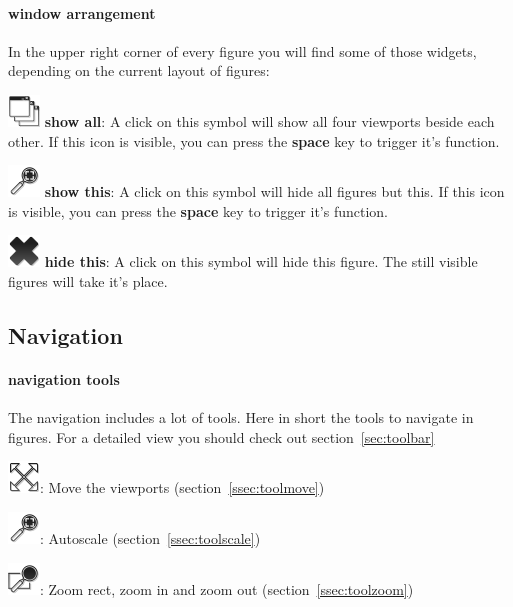 \documentclass[a4paper,11pt]{report}
\begin{document}
\paragraph{window arrangement} In the upper right corner of every figure you will find some of those widgets, depending on the current layout of figures:
\begin{trivlist}
\leftskip=1cm
\item[] \includegraphics[scale = 0.5]{../../icons/windows.png} \textbf{show all}: A click on this symbol will show all four viewports beside each other. If this icon is visible, you can press the \textbf{space} key to trigger it's function.
\item[] \includegraphics[scale = 0.5]{../../icons/zoom_all.png} \textbf{show this}: A click on this symbol will hide all figures but this. If this icon is visible, you can press the \textbf{space} key to trigger it's function.
\item[] \includegraphics[scale = 0.5]{../../icons/close.png} \textbf{hide this}: A click on this symbol will hide this figure. The still visible figures will take it's place.
\end{trivlist}


\subsection{Navigation}

\paragraph{navigation tools}
The navigation includes a lot of tools. Here in short the tools to navigate in figures. For a detailed view you should check out section~\ref{sec:toolbar}
\begin{trivlist}
	\leftskip=1cm
	\item[] \includegraphics[scale = 0.5]{../../icons/move.png}: Move the viewports (section~\ref{ssec:toolmove})
	\item[] \includegraphics[scale = 0.5]{../../icons/zoom_all.png}: Autoscale (section~\ref{ssec:toolscale})
	\item[] \includegraphics[scale = 0.5]{../../icons/zoom_rect.png}: Zoom rect, zoom in and zoom out (section~\ref{ssec:toolzoom})
\end{trivlist}
\end{document}
